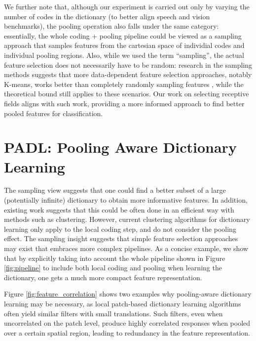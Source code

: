 We further note that, although our experiment is carried out only by varying the number of codes in the dictionary (to better align speech and vision benchmarks), the pooling operation also falls under the same category: essentially, the whole coding + pooling pipeline could be viewed as a \nystrom sampling approach that samples features from the cartesian space of individial codes and individual pooling regions. Also, while we used the term ``sampling'', the actual feature selection does not necessarily have to be random: research in the \nystrom sampling methods suggests that more data-dependent feature selection approaches, notably K-means, works better than completely randomly sampling features \cite{zhang2008improved,kumar2012sampling}, while the theoretical bound still applies to these scenarios. Our work on selecting receptive fields aligns with such work, providing a more informed approach to find better pooled features for classification.

\section{PADL: Pooling Aware Dictionary Learning}\label{sec:sizematters:algorithm}

The \nystrom sampling view suggests that one could find a better subset of a large (potentially infinite) dictionary to obtain more informative features. In addition, existing work suggests that this could be often done in an efficient way with methods such as clustering. However, current clustering algorithms for dictionary learning \cite{coates2010aistats,coates2011icml} only apply to the local coding step, and do not consider the pooling effect. The \nystrom sampling insight suggests that simple feature selection approaches may exist that embraces more complex pipelines. As a concise example, we show that by explicitly taking into account the whole pipeline shown in Figure \ref{fig:pipeline} to include both local coding and pooling when learning the dictionary, one gets a much more compact feature representation.

Figure \ref{fig:feature_correlation} shows two examples why pooling-aware dictionary learning may be necessary, as local patch-based dictionary learning algorithms often yield similar filters with small translations. Such filters, even when uncorrelated on the patch level, produce highly correlated responses when pooled over a certain spatial region, leading to redundancy in the feature representation.

